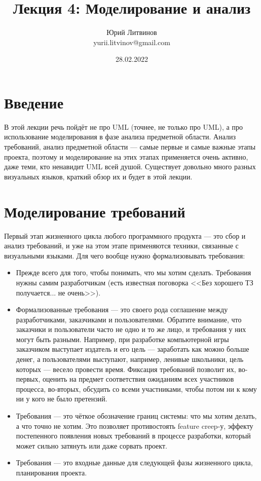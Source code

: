 \documentclass[a5paper]{article}
\title{Лекция 4:  Моделирование и анализ}
\author{Юрий Литвинов\\\small{yurii.litvinov@gmail.com}}
\date{28.02.2022}
\begin{document}
\maketitle
\thispagestyle{empty}

\section{Введение}

В этой лекции речь пойдёт не про UML (точнее, не только про UML), а про использование моделирования в фазе анализа предметной области. Анализ требований, анализ предметной области --- самые первые и самые важные этапы проекта, поэтому и моделирование на этих этапах применяется очень активно, даже теми, кто ненавидит UML всей душой. Существует довольно много разных визуальных языков, краткий обзор их и будет в этой лекции.

\section{Моделирование требований}

Первый этап жизненного цикла любого программного продукта --- это сбор и анализ требований, и уже на этом этапе применяются техники, связанные с визуальными языками. Для чего вообще нужно формализовывать требования:

\begin{itemize}
    \item Прежде всего для того, чтобы понимать, что мы хотим сделать. Требования нужны самим разработчикам (есть известная поговорка <<Без хорошего ТЗ получается... не очень>>).
    \item Формализованные требования --- это своего рода соглашение между разработчиками, заказчиками и пользователями. Обратите внимание, что заказчики и пользователи часто не одно и то же лицо, и требования у них могут быть разными. Например, при разработке компьютерной игры заказчиком выступает издатель и его цель --- заработать как можно больше денег, а пользователями выступают, например, ленивые школьники, цель которых --- весело провести время. Фиксация требований позволит их, во-первых, оценить на предмет соответствия ожиданиям всех участников процесса, во-вторых, обсудить со всеми участниками, чтобы потом ни к кому ни у кого не было претензий.
    \item Требования --- это чёткое обозначение границ системы: что мы хотим делать, а что точно не хотим. Это позволяет противостоять feature creep-у, эффекту постепенного появления новых требований в процессе разработки, который может сильно затянуть или даже сорвать проект.
    \item Требования --- это входные данные для следующей фазы жизненного цикла, планирования проекта.
\end{itemize}
\end{document}
